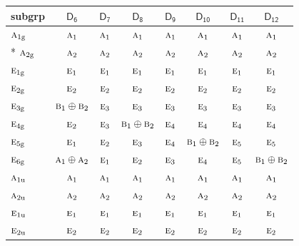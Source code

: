 \documentclass[10pt,a4paper]{article}
\numberwithin{equation}{section}
\newcommand{\grp}[1]{\mathsf{#1}}
\newcommand{\irr}[1]{\text{\normalfont\scshape #1}}
\newcommand{\ptag}[1]{\mathrm{#1}}
\begin{document}
{\small\begin{longtable}{@{}lccccccc@{}}\toprule
subgrp & \href{D6.pdf}{$\grp{D_{6}}$} & \href{D7.pdf}{$\grp{D_{7}}$} & \href{D8.pdf}{$\grp{D_{8}}$} & \href{D9.pdf}{$\grp{D_{9}}$} & \href{D10.pdf}{$\grp{D_{10}}$} & \href{D11.pdf}{$\grp{D_{11}}$} & \href{D12.pdf}{$\grp{D_{12}}$}\\\midrule\endhead
\bottomrule\endfoot\endlastfoot
$\irr{a}_{1\ptag{g}}$ & $\irr{a}_{1}$ & $\irr{a}_{1}$ & $\irr{a}_{1}$ & $\irr{a}_{1}$ & $\irr{a}_{1}$ & $\irr{a}_{1}$ & $\irr{a}_{1}$\\*
$\irr{a}_{2\ptag{g}}$ & $\irr{a}_{2}$ & $\irr{a}_{2}$ & $\irr{a}_{2}$ & $\irr{a}_{2}$ & $\irr{a}_{2}$ & $\irr{a}_{2}$ & $\irr{a}_{2}$\\
$\irr{e}_{1\ptag{g}}$ & $\irr{e}_{1}$ & $\irr{e}_{1}$ & $\irr{e}_{1}$ & $\irr{e}_{1}$ & $\irr{e}_{1}$ & $\irr{e}_{1}$ & $\irr{e}_{1}$\\
$\irr{e}_{2\ptag{g}}$ & $\irr{e}_{2}$ & $\irr{e}_{2}$ & $\irr{e}_{2}$ & $\irr{e}_{2}$ & $\irr{e}_{2}$ & $\irr{e}_{2}$ & $\irr{e}_{2}$\\
$\irr{e}_{3\ptag{g}}$ & $\irr{b}_{1}\oplus \irr{b}_{2}$ & $\irr{e}_{3}$ & $\irr{e}_{3}$ & $\irr{e}_{3}$ & $\irr{e}_{3}$ & $\irr{e}_{3}$ & $\irr{e}_{3}$\\
$\irr{e}_{4\ptag{g}}$ & $\irr{e}_{2}$ & $\irr{e}_{3}$ & $\irr{b}_{1}\oplus \irr{b}_{2}$ & $\irr{e}_{4}$ & $\irr{e}_{4}$ & $\irr{e}_{4}$ & $\irr{e}_{4}$\\
$\irr{e}_{5\ptag{g}}$ & $\irr{e}_{1}$ & $\irr{e}_{2}$ & $\irr{e}_{3}$ & $\irr{e}_{4}$ & $\irr{b}_{1}\oplus \irr{b}_{2}$ & $\irr{e}_{5}$ & $\irr{e}_{5}$\\
$\irr{e}_{6\ptag{g}}$ & $\irr{a}_{1}\oplus \irr{a}_{2}$ & $\irr{e}_{1}$ & $\irr{e}_{2}$ & $\irr{e}_{3}$ & $\irr{e}_{4}$ & $\irr{e}_{5}$ & $\irr{b}_{1}\oplus \irr{b}_{2}$\\
$\irr{a}_{1\ptag{u}}$ & $\irr{a}_{1}$ & $\irr{a}_{1}$ & $\irr{a}_{1}$ & $\irr{a}_{1}$ & $\irr{a}_{1}$ & $\irr{a}_{1}$ & $\irr{a}_{1}$\\
$\irr{a}_{2\ptag{u}}$ & $\irr{a}_{2}$ & $\irr{a}_{2}$ & $\irr{a}_{2}$ & $\irr{a}_{2}$ & $\irr{a}_{2}$ & $\irr{a}_{2}$ & $\irr{a}_{2}$\\
$\irr{e}_{1\ptag{u}}$ & $\irr{e}_{1}$ & $\irr{e}_{1}$ & $\irr{e}_{1}$ & $\irr{e}_{1}$ & $\irr{e}_{1}$ & $\irr{e}_{1}$ & $\irr{e}_{1}$\\
$\irr{e}_{2\ptag{u}}$ & $\irr{e}_{2}$ & $\irr{e}_{2}$ & $\irr{e}_{2}$ & $\irr{e}_{2}$ & $\irr{e}_{2}$ & $\irr{e}_{2}$ & $\irr{e}_{2}$\\

\end{longtable}}
\end{document}
